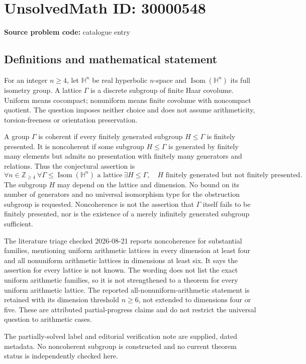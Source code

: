 \documentclass[11pt]{article}
\newcommand{\Z}{\mathbb{Z}}
\begin{document}
\section*{UnsolvedMath ID: 30000548}
\textbf{Source problem code:} catalogue entry
\subsection{Definitions and mathematical statement}
For an integer \(n\geq4\), let \(\mathbb H^n\) be real hyperbolic \(n\)-space and \(\operatorname{Isom}(\mathbb H^n)\) its full isometry group. A lattice \(\Gamma\) is a discrete subgroup of finite Haar covolume. Uniform means cocompact; nonuniform means finite covolume with noncompact quotient. The question imposes neither choice and does not assume arithmeticity, torsion-freeness or orientation preservation.

A group \(\Gamma\) is coherent if every finitely generated subgroup \(H\leq\Gamma\) is finitely presented. It is noncoherent if some subgroup \(H\leq\Gamma\) is generated by finitely many elements but admits no presentation with finitely many generators and relations. Thus the conjectural assertion is
\[
 \forall n\in\Z_{\geq4}\ \forall\Gamma\leq\operatorname{Isom}(\mathbb H^n)
 \text{ a lattice}\ \exists H\leq\Gamma,
 \quad H\text{ finitely generated but not finitely presented}.
\]
The subgroup \(H\) may depend on the lattice and dimension. No bound on its number of generators and no universal isomorphism type for the obstruction subgroup is requested. Noncoherence is not the assertion that \(\Gamma\) itself fails to be finitely presented, nor is the existence of a merely infinitely generated subgroup sufficient.

The literature triage checked 2026-08-21 reports noncoherence for substantial families, mentioning uniform arithmetic lattices in every dimension at least four and all nonuniform arithmetic lattices in dimensions at least six. It says the assertion for every lattice is not known. The wording does not list the exact uniform arithmetic families, so it is not strengthened to a theorem for every uniform arithmetic lattice. The reported all-nonuniform-arithmetic statement is retained with its dimension threshold \(n\geq6\), not extended to dimensions four or five. These are attributed partial-progress claims and do not restrict the universal question to arithmetic cases.

The partially-solved label and editorial verification note are supplied, dated metadata. No noncoherent subgroup is constructed and no current theorem status is independently checked here.
\end{document}
